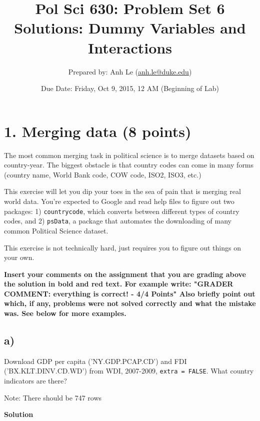 \documentclass{article}\usepackage[]{graphicx}\usepackage[]{color}
\begin{document}
\title{Pol Sci 630: Problem Set 6 Solutions: Dummy Variables and Interactions}

\author{Prepared by: Anh Le (\href{mailto:anh.le@duke.edu}{anh.le@duke.edu})}

\date{Due Date: Friday, Oct 9, 2015, 12 AM (Beginning of Lab)}

\maketitle

\section*{1. Merging data (8 points)}

The most common merging task in political science is to merge datasets based on country-year. The biggest obstacle is that country codes can come in many forms (country name, World Bank code, COW code, ISO2, ISO3, etc.)

This exercise will let you dip your toes in the sea of pain that is merging real world data. You're expected to Google and read help files to figure out two packages: 1) \verb`countrycode`, which converts between different types of country codes, and 2) \verb`psData`, a package that automates the downloading of many common Political Science dataset.

This exercise is not technically hard, just requires you to figure out things on your own.

\textbf{\color{red} Insert your comments on the assignment that you are grading above the solution in bold and red text. For example write: "GRADER COMMENT: everything is correct! - 4/4 Points" Also briefly point out which, if any, problems were not solved correctly and what the mistake was. See below for more examples.}

\subsection*{a)}

Download GDP per capita ('NY.GDP.PCAP.CD') and FDI ('BX.KLT.DINV.CD.WD') from WDI, 2007-2009, \verb`extra = FALSE`. What country indicators are there?

Note: There should be 747 rows

\textbf{Solution}
\end{document}
